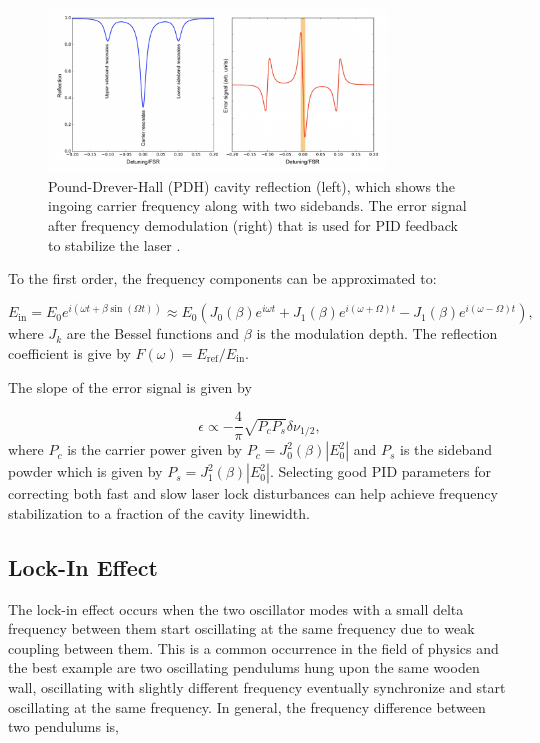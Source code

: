 \documentclass[a4paper]{report}
\numberwithin{equation}{section}
\begin{document}
\begin{figure}[htpb]
    \centering
    \includegraphics[width=0.8\textwidth]{error-signal}
	\caption{Pound-Drever-Hall (PDH) cavity reflection (left), which shows the ingoing carrier frequency along with two sidebands. The error signal after frequency demodulation (right) that is used for PID feedback to stabilize the laser \cite{pdhmanual}.}
    \label{fig:error-signal}
\end{figure}

To the first order, the frequency components can be approximated to: 

\begin{equation}
		E_{\mathrm{in}} = E_{0} e^{i \left(\omega t + \beta \sin(\Omega t) \right) } \approx E_{0} \left(J_{0} (\beta) e^{i \omega t } + J_{1}(\beta) e^{i(\omega + \Omega) t} - J_{1}(\beta) e^{i (\omega - \Omega)t} \right),
\end{equation}
where $J_{k}$ are the Bessel functions and $\beta$ is the modulation depth. The reflection coefficient is give by $F(\omega) = E_{\mathrm{ref}} / E_{\mathrm{in}}$.

The slope of the error signal is given by

\begin{equation}
		\epsilon \propto - \frac{4}{\pi} \sqrt{P_{c} P_{s}} \delta \nu _{1/2}, 
\end{equation}
where $P_{c}$ is the carrier power given by $P_{c} = J_{0}^2 (\beta) \left| E_{0}^2 \right| $ and $P_{s}$ is the sideband powder which is given by $P_{s} = J_{1}^2 (\beta) \left| E_{0}^2 \right| $.
Selecting good PID parameters for correcting both fast and slow laser lock disturbances can help achieve frequency stabilization to a fraction of the cavity linewidth. 

\subsection{Lock-In Effect} \label{sec:lockin_effect}
The lock-in effect occurs when the two oscillator modes with a small delta frequency between them start oscillating at the same frequency due to weak coupling between them. This is a common occurrence in the field of physics and the best example are two oscillating pendulums hung upon the same wooden wall, oscillating with slightly different frequency eventually synchronize and start oscillating at the same frequency. In general, the frequency difference between two pendulums is, 
\end{document}
